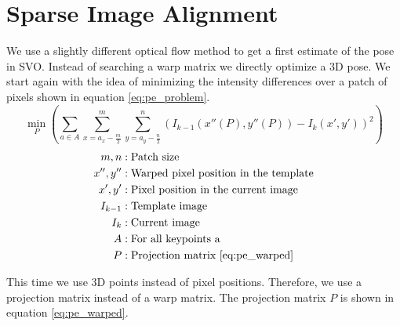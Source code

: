 \documentclass[11pt,a4paper,titlepage,oneside]{report}
\begin{document}
\section{Sparse Image Alignment}\label{sec:pose_estimation}
We use a slightly different optical flow method to get a first estimate of the pose in SVO. Instead of searching a warp matrix we directly optimize a 3D pose. We start again with the idea of minimizing the intensity differences over a patch of pixels shown in equation \ref{eq:pe_problem}.
\begin{equation}\label{eq:pe_problem}
  \min_P(\sum_{a \in A}\sum_{x=a_x-\frac{m}{2}}^m\sum_{y=a_y-\frac{n}{2}}^n(I_{k-1}(x''(P),y''(P))-I_{k}(x',y'))^2)
\end{equation}
\begin{align*}
  m,n       &: \text{Patch size}\\
  x'',y''   &: \text{Warped pixel position in the template}\\
  x',y'     &: \text{Pixel position in the current image}\\
  I_{k-1}   &: \text{Template image}\\
  I_{k}     &: \text{Current image}\\
  A         &: \text{For all keypoints a}\\
  P         &: \text{Projection matrix \ref{eq:pe_warped}}
\end{align*}

This time we use 3D points instead of pixel positions. Therefore, we use a projection matrix instead of a warp matrix. The projection matrix $P$ is shown in equation \ref{eq:pe_warped}. 
\end{document}
